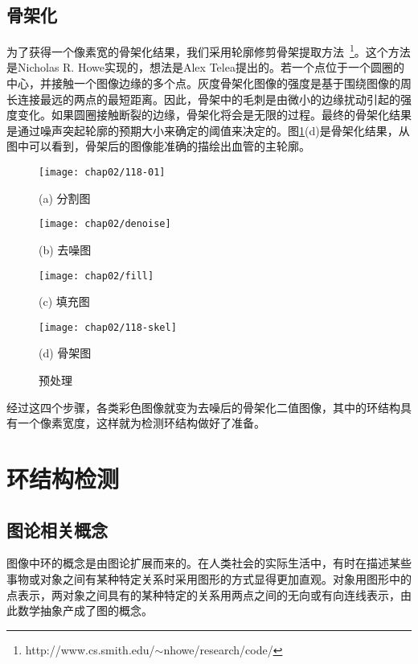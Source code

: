 \subsection{骨架化}
为了获得一个像素宽的骨架化结果，我们采用轮廓修剪骨架提取方法~\footnote{http://www.cs.smith.edu/$\sim$nhowe/research/code/}。这个方法是Nicholas R. Howe实现的，想法是Alex Telea提出的。若一个点位于一个圆圈的中心，并接触一个图像边缘的多个点。灰度骨架化图像的强度是基于围绕图像的周长连接最远的两点的最短距离。因此，骨架中的毛刺是由微小的边缘扰动引起的强度变化。如果圆圈接触断裂的边缘，骨架化将会是无限的过程。最终的骨架化结果是通过噪声突起轮廓的预期大小来确定的阈值来决定的。图\ref{fig:Preprocessing}(d)是骨架化结果，从图中可以看到，骨架后的图像能准确的描绘出血管的主轮廓。
\begin{figure}[H]
\centering
  \begin{minipage}[b]{0.48\textwidth}
    \centering
    \texttt{[image: chap02/118-01]}
      \centerline{(a) 分割图}\medskip
  \end{minipage}
  \begin{minipage}[b]{0.48\textwidth}
    \centering
    \texttt{[image: chap02/denoise]}
      \centerline{(b) 去噪图}\medskip
  \end{minipage}
  \begin{minipage}[b]{0.48\textwidth}
    \centering
    \texttt{[image: chap02/fill]}
      \centerline{(c) 填充图}\medskip
  \end{minipage}
  \begin{minipage}[b]{0.48\textwidth}
    \centering
    \texttt{[image: chap02/118-skel]}
      \centerline{(d) 骨架图}\medskip
  \end{minipage}
\caption{预处理}
\label{fig:Preprocessing}
\end{figure}

经过这四个步骤，各类彩色图像就变为去噪后的骨架化二值图像，其中的环结构具有一个像素宽度，这样就为检测环结构做好了准备。

\section{环结构检测}
\label{}
\subsection{图论相关概念}
\label{}

图像中环的概念是由图论扩展而来的。在人类社会的实际生活中，有时在描述某些事物或对象之间有某种特定关系时采用图形的方式显得更加直观。对象用图形中的点表示，两对象之间具有的某种特定的关系用两点之间的无向或有向连线表示，由此数学抽象产成了图的概念。

